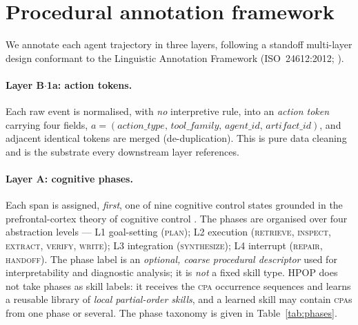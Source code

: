 \documentclass[11pt]{article}
\newcommand{\cpa}{\textsc{cpa}}
\begin{document}
\section{Procedural annotation framework}
\label{sec:framework}

We annotate each agent trajectory in three layers, following a standoff multi-layer
design conformant to the Linguistic Annotation Framework
(ISO~24612{:}2012; \cite{bird1999}).

\paragraph{Layer B$\cdot$1a: action tokens.}
Each raw event is normalised, with \emph{no} interpretive rule, into an
\emph{action token} carrying four fields,
$a = (\textit{action\_type},\,\textit{tool\_family},\,\textit{agent\_id},\,\textit{artifact\_id})$,
and adjacent identical tokens are merged (de-duplication). This is pure data cleaning
and is the substrate every downstream layer references.

\paragraph{Layer A: cognitive phases.}
Each span is assigned, \emph{first}, one of nine cognitive control states grounded in
the prefrontal-cortex theory of cognitive control \cite{miller2001}. The phases are
organised over four abstraction levels --- L1 goal-setting (\textsc{plan}); L2 execution
(\textsc{retrieve}, \textsc{inspect}, \textsc{extract}, \textsc{verify}, \textsc{write});
L3 integration (\textsc{synthesize}); L4 interrupt (\textsc{repair}, \textsc{handoff}).
The phase label is an \emph{optional, coarse procedural descriptor} used for interpretability and
diagnostic analysis; it is \emph{not} a fixed skill type. HPOP does not take phases as skill labels:
it receives the \cpa{} occurrence sequences and learns a reusable library of \emph{local
partial-order skills}, and a learned skill may contain \cpa s from one phase or several. The phase
taxonomy is given in Table~\ref{tab:phases}.
\end{document}
